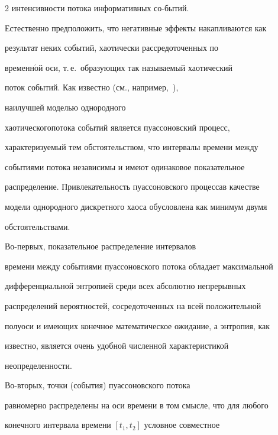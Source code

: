\begin{multicols}{2}
интенсивности потока информативных со-\linebreak бытий.





Естественно предположить, что негативные эффекты накапливаются как


результат неких событий, хаотически рассредоточенных по


временн$\acute{\mbox{о}}$й оси, т.\,е.\ образующих так называемый хаотический


поток событий. Как известно (см., например,~\cite{KorolevSokolov2008}),\linebreak 


наилучшей моделью однородного


хаотического\linebreak потока событий является пуассоновский процесс,


характеризуемый тем обстоятельством, что интервалы времени между


событиями потока независимы и имеют одинаковое показательное


распределение. Привлекательность пуассоновского процесса\linebreak в качестве


модели однородного дискретного хаоса обусловлена как минимум двумя


обстоятельствами. 





Во-пер\-вых, показательное распределение ин\-тер\-ва\-лов


времени между событиями пуассоновского потока обладает максимальной


дифференциальной энтропией среди всех абсолютно непрерывных


распределений вероятностей, сосредоточенных на всей положительной


полуоси и имеющих конечное математическое ожидание, а энтропия, как


известно, является очень удобной численной характеристикой


неопределенности. 





Во-вто\-рых, точки (события) пуассоновского потока


равномерно распределены на оси времени в том смысле, что для любого


конечного интервала времени $[t_1,t_2]$ условное совместное



\end{multicols}
